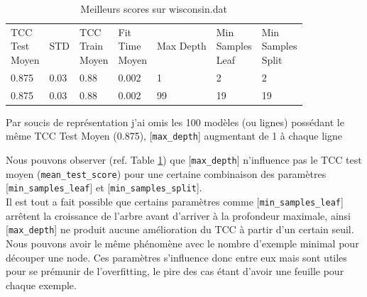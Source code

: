 \documentclass[10pt,letterpaper]{article}
\newlength\savedwidth
\newcommand\thickhline{\noalign{\global\savedwidth\arrayrulewidth\global\arrayrulewidth 2pt}%
\hline
\noalign{\global\arrayrulewidth\savedwidth}}
\begin{document}
\begin{table}[h]
  {\centering
  \caption{Meilleurs scores sur wisconsin.dat}
  \label{table:scores_wisc}
  \begin{adjustbox}{width=\textwidth}
\begin{tabular}{lllllll}
\hline
\thead{TCC \\Test\\ Moyen} & STD & \thead{TCC\\ Train \\Moyen} & \thead{Fit \\Time\\ Moyen} & Max Depth & \thead{Min \\Samples \\Leaf} & \thead{Min \\Samples \\Split}
\\ \thickhline

0.875 & 0.03 & \hspace{5mm}0.88 & \hspace{5mm}0.002 & \hspace{5mm}1 & \hspace{5mm}2 &\hspace{5mm}2 \\ \hline
0.875 & 0.03 & \hspace{5mm}0.88 & \hspace{5mm}0.002 & \hspace{5mm}99 & \hspace{5mm}19 &\hspace{5mm}19 \\ \hline
\end{tabular}
\end{adjustbox}}
\footnotesize{Par soucis de représentation j’ai omis les 100 modèles (ou lignes) possédant le même TCC Test Moyen (0.875), [\verb!max_depth!] augmentant de 1 à chaque ligne
}
\end{table}
Nous pouvons observer (ref. Table \ref{table:scores_wisc}) que [\verb!max_depth!] n’influence pas le TCC test moyen (\verb!mean_test_score!) pour une certaine combinaison des paramètres [\verb!min_samples_leaf!] et [\verb!min_samples_split!].\\
\vspace{2mm}
Il est tout a fait possible que certains paramètres comme [\verb!min_samples_leaf!] arrêtent la croissance de l’arbre avant d’arriver à la profondeur maximale, ainsi [\verb!max_depth!] ne produit aucune amélioration du TCC à partir d’un certain seuil. Nous pouvons avoir le même phénomène avec le nombre d’exemple minimal pour découper une node. Ces paramètres s’influence donc entre eux mais sont utiles pour se prémunir de l’overfitting, le pire des cas étant d’avoir une feuille pour chaque exemple.
\end{document}
